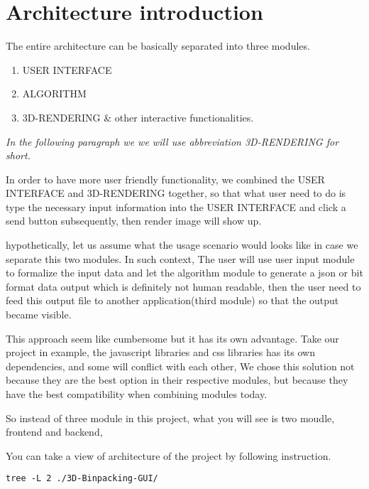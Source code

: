 \documentclass{article}
\begin{document}
\section{Architecture introduction}
The entire architecture can be basically separated into three modules.\newline
\begin{enumerate}
\item USER INTERFACE
\item ALGORITHM
\item 3D-RENDERING \& other interactive functionalities.
\end{enumerate}

\textit{In the following paragraph we we will use abbreviation 3D-RENDERING for short.}
\newline

In order to have more user friendly functionality, we combined the USER INTERFACE and 3D-RENDERING together, so that what user need to do is type the necessary input information into the USER INTERFACE and click a send button subsequently, then render image will show up.\newline

hypothetically, let us assume what the usage scenario would looks like in case we separate this two modules.
In such context, The user will use user input module to formalize the input data and let the algorithm module to generate a json or bit format data output which is definitely not human readable, then the user need to feed this output file to another application(third module) so that the output became visible.\newline

This approach seem like cumbersome but it has its own advantage.
Take our project in example, the javascript libraries and css libraries has its own dependencies, and some will conflict with each other, We chose this solution not because they are the best option in their respective modules, but because they have the best compatibility when combining modules today.

So instead of three module in this project, what you will see is two moudle, frontend and backend,

You can take a view of architecture of the project by following instruction.
\begin{mdframed}[backgroundcolor=bg]
\begin{verbatim}
tree -L 2 ./3D-Binpacking-GUI/
\end{verbatim}
\end{mdframed}
\end{document}

